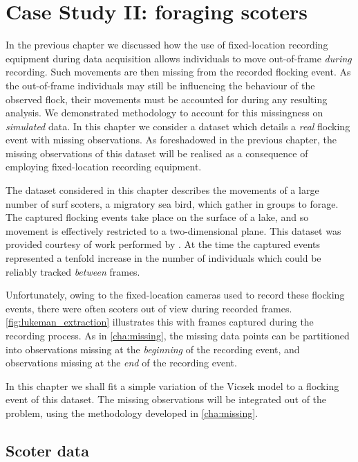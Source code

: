 \graphicspath{{fig/scoters/}}

\chapter{Case Study II: foraging scoters}
\label{cha:scoters}

In the previous chapter we discussed how the use of fixed-location recording
equipment during data acquisition allows individuals to move out-of-frame
\emph{during} recording. Such movements are then missing from the recorded
flocking event. As the out-of-frame individuals may still be influencing the
behaviour of the observed flock, their movements must be accounted for during
any resulting analysis. We demonstrated methodology to account for this
missingness on \emph{simulated} data. In this chapter we consider a dataset
which details a \emph{real} flocking event with missing observations. As
foreshadowed in the previous chapter, the missing observations of this dataset
will be realised as a consequence of employing fixed-location recording
equipment.

The dataset considered in this chapter describes the movements of a large
number of surf scoters, a migratory sea bird, which gather in groups to forage.
The captured flocking events take place on the surface of a lake, and so
movement is effectively restricted to a two-dimensional plane. This dataset was
provided courtesy of work performed by \textcite{lukeman09,lukeman10}. At the
time the captured events represented a tenfold increase in the number of
individuals which could be reliably tracked \emph{between} frames.

Unfortunately, owing to the fixed-location cameras used to record these
flocking events, there were often scoters out of view during recorded frames.
\cref{fig:lukeman_extraction} illustrates this with frames captured during the
recording process. As in \cref{cha:missing}, the missing data points can be
partitioned into observations missing at the \emph{beginning} of the recording
event, and observations missing at the \emph{end} of the recording event.

In this chapter we shall fit a simple variation of the Vicsek model to a
flocking event of this dataset. The missing observations will be integrated out
of the problem, using the methodology developed in \cref{cha:missing}.

\section{Scoter data}

